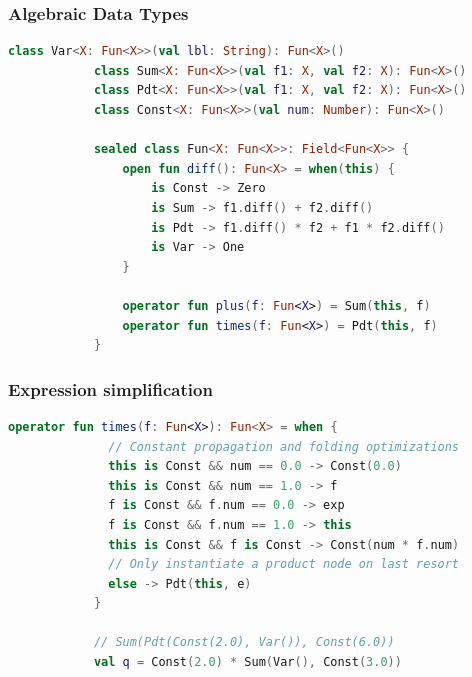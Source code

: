 \documentclass{beamer}
\begin{document}
    \begin{frame}[fragile]
        \frametitle{Algebraic Data Types}
        \begin{lstlisting}[language=Kotlin, gobble=12]
            class Var<X: Fun<X>>(val lbl: String): Fun<X>()
            class Sum<X: Fun<X>>(val f1: X, val f2: X): Fun<X>()
            class Pdt<X: Fun<X>>(val f1: X, val f2: X): Fun<X>()
            class Const<X: Fun<X>>(val num: Number): Fun<X>()

            sealed class Fun<X: Fun<X>>: Field<Fun<X>> {
                open fun diff(): Fun<X> = when(this) {
                    is Const -> Zero
                    is Sum -> f1.diff() + f2.diff()
                    is Pdt -> f1.diff() * f2 + f1 * f2.diff()
                    is Var -> One
                }

                operator fun plus(f: Fun<X>) = Sum(this, f)
                operator fun times(f: Fun<X>) = Pdt(this, f)
            }
        \end{lstlisting}
    \end{frame}

    \begin{frame}[fragile]
        \frametitle{Expression simplification}
        \begin{lstlisting}[language=Kotlin, gobble=12]
            operator fun times(f: Fun<X>): Fun<X> = when {
              // Constant propagation and folding optimizations
              this is Const && num == 0.0 -> Const(0.0)
              this is Const && num == 1.0 -> f
              f is Const && f.num == 0.0 -> exp
              f is Const && f.num == 1.0 -> this
              this is Const && f is Const -> Const(num * f.num)
              // Only instantiate a product node on last resort
              else -> Pdt(this, e)
            }

            // Sum(Pdt(Const(2.0), Var()), Const(6.0))
            val q = Const(2.0) * Sum(Var(), Const(3.0))
        \end{lstlisting}
    \end{frame}
\end{document}
